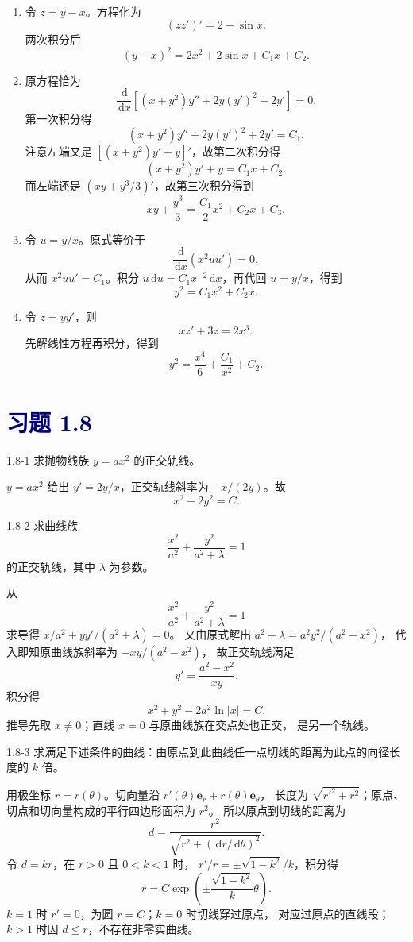 \documentclass[UTF8,a4paper,11pt]{ctexart}
\newcommand{\dd}{\,\mathrm d}
\newcommand{\sect}[1]{\section*{\textcolor{navy}{习题 #1}}}
\begin{document}
\begin{solution}
\begin{enumerate}[label=(\arabic*)]
\[\]
\item 令 $z=y-x$。方程化为
\[
(zz')'=2-\sin x.
\]
两次积分后
\[
\boxed{(y-x)^2=2x^2+2\sin x+C_1x+C_2}.
\]
\item 原方程恰为
\[
\frac{\dd}{\dd x}\left[(x+y^2)y''+2y(y')^2+2y'\right]=0.
\]
第一次积分得
\[
(x+y^2)y''+2y(y')^2+2y'=C_1.
\]
注意左端又是 $[(x+y^2)y'+y]'$，故第二次积分得
\[
(x+y^2)y'+y=C_1x+C_2.
\]
而左端还是 $(xy+y^3/3)'$，故第三次积分得到
\[
\boxed{xy+\frac{y^3}{3}=\frac{C_1}{2}x^2+C_2x+C_3}.
\]
\item 令 $u=y/x$。原式等价于
\[
\frac{\dd}{\dd x}(x^2uu')=0,
\]
从而 $x^2uu'=C_1$。积分 $u\dd u=C_1x^{-2}\dd x$，再代回 $u=y/x$，得到
\[
\boxed{y^2=C_1x^2+C_2x}.
\]
\item 令 $z=yy'$，则
\[
xz'+3z=2x^3.
\]
先解线性方程再积分，得到
\[
\boxed{y^2=\frac{x^4}{6}+\frac{C_1}{x^2}+C_2}.
\]
\end{enumerate}
\end{solution}


\sect{1.8}
\begin{problem}{1.8-1}
求抛物线族 $y=ax^2$ 的正交轨线。
\end{problem}

\begin{solution}
$y=ax^2$ 给出 $y'=2y/x$，正交轨线斜率为 $-x/(2y)$。故
\[
\boxed{x^2+2y^2=C}.
\]
\end{solution}

\begin{problem}{1.8-2}
求曲线族
  \[
    \frac{x^2}{a^2}+\frac{y^2}{a^2+\lambda}=1
  \]
  的正交轨线，其中 $\lambda$ 为参数。
\end{problem}

\begin{solution}
从
\[
\frac{x^2}{a^2}+\frac{y^2}{a^2+\lambda}=1
\]
求导得 $x/a^2+yy'/(a^2+\lambda)=0$。
又由原式解出 $a^2+\lambda=a^2y^2/(a^2-x^2)$，
代入即知原曲线族斜率为 $-xy/(a^2-x^2)$，
故正交轨线满足
\[
y' =\frac{a^2-x^2}{xy}.
\]
积分得
\[
\boxed{x^2+y^2-2a^2\ln|x|=C}.
\]
推导先取 $x\ne0$；直线 $\boxed{x=0}$ 与原曲线族在交点处也正交，
是另一个轨线。
\end{solution}

\begin{problem}{1.8-3}
求满足下述条件的曲线：由原点到此曲线任一点切线的距离为此点的向径长度的 $k$ 倍。
\end{problem}

\begin{solution}
用极坐标 $r=r(\theta)$。切向量沿
$r'(\theta)\mathbf e_r+r(\theta)\mathbf e_\theta$，
长度为 $\sqrt{r'^2+r^2}$；原点、切点和切向量构成的平行四边形面积为 $r^2$。
所以原点到切线的距离为
\[
d=\frac{r^2}{\sqrt{r^2+(\dd r/\dd\theta)^2}}.
\]
令 $d=kr$，在 $r>0$ 且 $0<k<1$ 时，
$r'/r=\pm\sqrt{1-k^2}/k$，积分得
\[
\boxed{r=C\exp\!\left(\pm\frac{\sqrt{1-k^2}}{k}\theta\right)}.
\]
$k=1$ 时 $r'=0$，为圆 $r=C$；$k=0$ 时切线穿过原点，
对应过原点的直线段；$k>1$ 时因 $d\le r$，不存在非零实曲线。
\end{solution}
\end{document}
